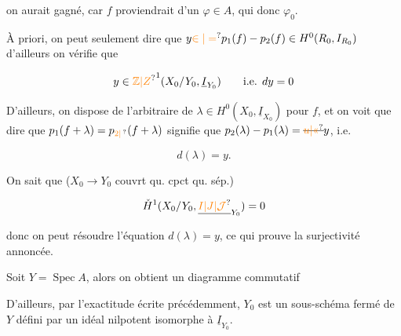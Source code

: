 on aurait gagné, car $f$ proviendrait d'un $\varphi\in A$, qui   donc $\varphi_0$.


À priori, on peut seulement dire que $y\unsure{\in|=}p_1(f)-p_2(f)\in H^0(R_0,I_{R_0})$ d'ailleurs on vérifie que

\[
y\in{\unsure{\mathbb Z|Z}}^{1}(X_0/Y_0,\underline I_{Y_0})\qquad\text{i.e. }dy=0
\]

D'ailleurs, on dispose de l'arbitraire de $\lambda\in H^0(X_0,\underline I_{X_0})$ pour $f$, et on voit que  dire que $p_1(f+\lambda)=p_{\unsure{2|\,}}(f+\lambda)$ signifie que $p_2(\lambda)-p_1(\lambda)=\deleted{\unsure{u|\text{«}}}y$, i.e.

\[
d(\lambda)=y.
\]

On sait que ($X_0\longrightarrow Y_0$  couvrt qu. cpct qu. sép.)

\[
\check H^1(X_0/Y_0,\underline{\unsure{I|J|\mathcal J}}_{Y_0})=0
\]

donc on peut résoudre l'équation $d(\lambda)=y$, ce qui prouve la surjectivité annoncée.

 Soit $Y=\operatorname{Spec} A$, alors  on obtient un diagramme commutatif


D'ailleurs,  par l'exactitude écrite précédemment, $Y_0$ est un sous-schéma fermé de $Y$ défini par un idéal nilpotent isomorphe à $\underline I_{Y_0}$.

